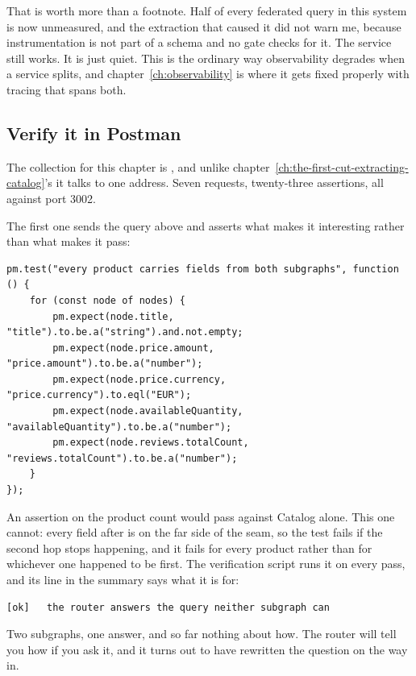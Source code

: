 That is worth more than a footnote. Half of every federated query in this
system is now unmeasured, and the extraction that caused it did not warn me,
because instrumentation is not part of a schema and no gate checks for it. The
service still works. It is just quiet. This is the ordinary way observability
degrades when a service splits, and
chapter~\ref{ch:observability} is where it gets fixed properly with tracing that
spans both.

\subsection*{Verify it in Postman}

%
The collection for this chapter is ,
and unlike chapter~\ref{ch:the-first-cut-extracting-catalog}'s it talks to one
address. Seven requests, twenty-three assertions, all against port 3002.

The first one sends the query above and asserts what makes it interesting rather
than what makes it pass:

\begin{verbatim}
pm.test("every product carries fields from both subgraphs", function () {
    for (const node of nodes) {
        pm.expect(node.title, "title").to.be.a("string").and.not.empty;
        pm.expect(node.price.amount, "price.amount").to.be.a("number");
        pm.expect(node.price.currency, "price.currency").to.eql("EUR");
        pm.expect(node.availableQuantity, "availableQuantity").to.be.a("number");
        pm.expect(node.reviews.totalCount, "reviews.totalCount").to.be.a("number");
    }
});
\end{verbatim}

%
An assertion on the product count would pass against Catalog alone. This one
cannot: every field after  is on the far side of the seam, so the
test fails if the second hop stops happening, and it fails for every product
rather than for whichever one happened to be first. The verification script runs
it on every pass, and its line in the summary says what it is for:

\begin{verbatim}
[ok]   the router answers the query neither subgraph can
\end{verbatim}

Two subgraphs, one answer, and so far nothing about how. The router will tell
you how if you ask it, and it turns out to have rewritten the question on the
way in.

%
